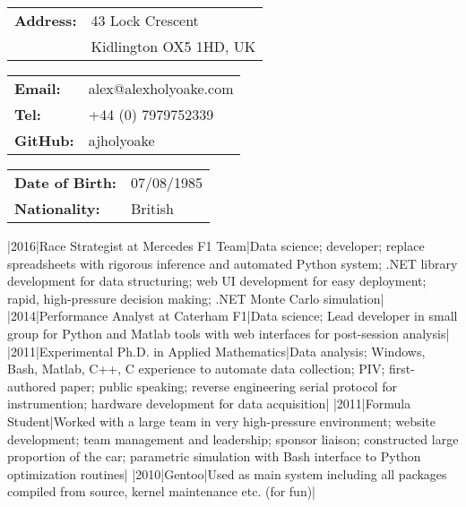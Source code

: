 \documentclass[a4paper,10pt]{article}
\begin{document}
\small
\smallskip
\vspace*{0.0cm}

{\begin{tabular}{ll}
\textbf{Address:} & 43 Lock Crescent\\
 & Kidlington OX5 1HD, UK\\
\end{tabular}}
{\begin{tabular}{ll}
\textbf{Email:} & alex@alexholyoake.com\\
   \textbf{Tel:} & +44 (0) 7979752339 \\
   \textbf{GitHub:} & ajholyoake \\
\end{tabular}}
{\begin{tabular}{ll}
\textbf{Date of Birth:} & 07/08/1985 \\
\textbf{Nationality:} & British \\
\end{tabular}}

\normalsize 
\begin{cvsection}
   |2016|Race Strategist at Mercedes F1 Team|Data science; developer; replace spreadsheets with
   rigorous inference and automated Python system; .NET library development for
   data structuring; web UI development for easy deployment; rapid, high-pressure decision making; .NET Monte Carlo simulation|
   |2014|Performance Analyst at Caterham F1|Data science; Lead developer
   in small group for Python and Matlab tools with web interfaces for post-session analysis|
   |2011|Experimental Ph.D. in Applied Mathematics|Data analysis;
   Windows, Bash, Matlab, C++, C experience to automate data collection; PIV;
   first-authored paper; public speaking; reverse engineering serial protocol for
   instrumention; hardware development for data acquisition|
   |2011|Formula Student|Worked with a large team in very high-pressure
   environment; website development; team management and leadership; sponsor liaison; constructed large
   proportion of the car; parametric simulation with Bash interface to Python
   optimization routines|
   |2010|Gentoo|Used as main system including all packages compiled from
   source, kernel maintenance etc. (for fun)|
\end{cvsection}


\end{document}
